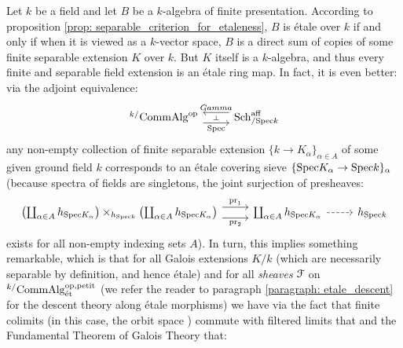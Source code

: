         \begin{corollary} \label{coro: finite_separable_extensions_are_etale}
            Let $k$ be a field and let $B$ be a $k$-algebra of finite presentation. According to proposition \ref{prop: separable_criterion_for_etaleness}, $B$ is \'etale over $k$ if and only if when it is viewed as a $k$-vector space, $B$ is a direct sum of copies of some finite separable extension $K$ over $k$. But $K$ itself is a $k$-algebra, and thus every finite and separable field extension is an \'etale ring map. In fact, it is even better: via the adjoint equivalence:
                $$
                    \begin{tikzcd}
                    	{{}^{k/}\Comm\Alg^{\op}} & {\Sch^{\aff}_{/\Spec k}}
                    	\arrow[""{name=0, anchor=center, inner sep=0}, "\Spec"', shift right=2, from=1-1, to=1-2]
                    	\arrow[""{name=1, anchor=center, inner sep=0}, "Gamma"', shift right=2, from=1-2, to=1-1]
                    	\arrow["\dashv"{anchor=center, rotate=-90}, draw=none, from=1, to=0]
                    \end{tikzcd}
                $$
            any non-empty collection of finite separable extension $\{k \to K_{\alpha}\}_{\alpha \in A}$ of some given ground field $k$ corresponds to an \'etale covering sieve $\{\mathrm{Spec} K_{\alpha} \to \mathrm{Spec} k\}_{\alpha}$ (because spectra of fields are singletons, the joint surjection of presheaves:
                $$
                    \begin{tikzcd}
                    	{\left(\coprod_{\alpha \in A} h_{\Spec K_{\alpha}}\right) \x_{h_{\Spec k}} \left(\coprod_{\alpha \in A} h_{\Spec K_{\alpha}}\right)} & {\coprod_{\alpha \in A} h_{\Spec K_{\alpha}}} & {h_{\Spec k}}
                    	\arrow["{\pr_2}"', shift right=2, from=1-1, to=1-2]
                    	\arrow["{\pr_1}", shift left=2, from=1-1, to=1-2]
                    	\arrow[dashed, from=1-2, to=1-3]
                    \end{tikzcd}
                $$
            exists for all non-empty indexing sets $A$). In turn, this implies something remarkable, which is that for all Galois extensions $K/k$ (which are necessarily separable by definition, and hence \'etale) and for all \textit{sheaves} $\mathcal{F}$ on ${}^{k/}\mathrm{Comm}\mathrm{Alg}^{\mathrm{op}, \mathrm{petit}}_{\mathrm{\acute{e}t}}$ (we refer the reader to paragraph \ref{paragraph: etale_descent} for the descent theory along \'etale morphisms) we have via the fact that finite colimits (in this case, the orbit space ) commute with filtered limits that and the Fundamental Theorem of Galois Theory that:

\end{corollary}
